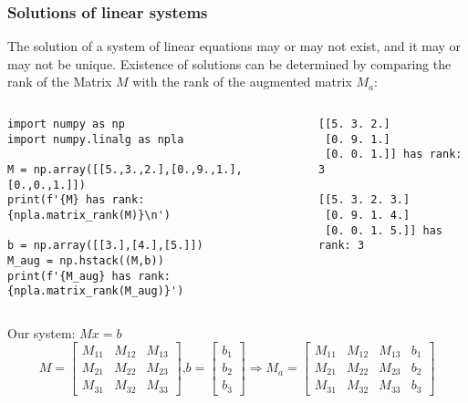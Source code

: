 \begin{frame}[fragile]
  \frametitle{Solutions of linear systems}
  The solution of a system of linear equations may or may not exist, and it may or may not be unique. Existence of solutions can be determined by comparing the rank of the Matrix $M$ with the rank of the augmented matrix $M_a$:
  \begin{columns}
    \begin{lstlisting}
import numpy as np
import numpy.linalg as npla

M = np.array([[5.,3.,2.],[0.,9.,1.],[0.,0.,1.]])
print(f'{M} has rank: {npla.matrix_rank(M)}\n')

b = np.array([[3.],[4.],[5.]])
M_aug = np.hstack((M,b))
print(f'{M_aug} has rank: {npla.matrix_rank(M_aug)}')
    \end{lstlisting}
    \begin{lstlisting}[style=output]
[[5. 3. 2.]
 [0. 9. 1.]
 [0. 0. 1.]] has rank: 3

[[5. 3. 2. 3.]
 [0. 9. 1. 4.]
 [0. 0. 1. 5.]] has rank: 3
    \end{lstlisting}
  \end{columns}
  Our system: $Mx = b$
  \[ 
    M = \begin{bmatrix}
    M_{11} & M_{12} & M_{13}\\ 
    M_{21} & M_{22} & M_{23}\\ 
    M_{31} & M_{32} & M_{33}
    \end{bmatrix} \text{,} b=\begin{bmatrix}b_1\\b_2\\b_3  \end{bmatrix} \Rightarrow 
    M_a =     \begin{bmatrix}
    M_{11} & M_{12} & M_{13} & b_1\\ 
    M_{21} & M_{22} & M_{23} & b_2\\ 
    M_{31} & M_{32} & M_{33} & b_3
    \end{bmatrix}
  \]
\end{frame}

